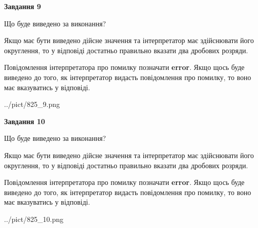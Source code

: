 \documentclass[12pt, ukrainian]{article}
\begin{document}
{\begin {Large}
{\begin {center}\textbf{Завдання 9}\end {center}}\par
Що буде виведено за виконання? \par

Якщо має бути виведено дійсне значення та інтерпретатор має здійснювати його округлення, 
то у відповіді достатньо правильно вказати два дробових розряди.

Повідомлення інтерпретатора про помилку позначати \textbf{error}.
Якщо щось буде виведено до того, як інтерпретатор видасть повідомлення про помилку, 
то воно має вказуватись у відповіді. \par

\begin{center}
	{../pict/825_9.png}
\end{center}
\newpage

{\begin {center}\textbf{Завдання 10}\end {center}}\par
Що буде виведено за виконання? \par

Якщо має бути виведено дійсне значення та інтерпретатор має здійснювати його округлення, 
то у відповіді достатньо правильно вказати два дробових розряди.

Повідомлення інтерпретатора про помилку позначати \textbf{error}.
Якщо щось буде виведено до того, як інтерпретатор видасть повідомлення про помилку, 
то воно має вказуватись у відповіді. \par

\begin{center}
	{../pict/825_10.png}
\end{center}
\newpage

\end {Large}}
\end{document}
